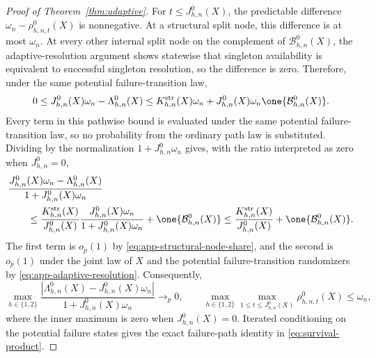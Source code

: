 \begin{appendix}
\begin{proof}[Proof of Theorem~\ref{thm:adaptive}]
For \(t\le J_{h,n}^0(X)\), the predictable difference
\(\omega_n-\rho_{h,n,t}^0(X)\) is nonnegative. At a structural split node, this
difference is at most \(\omega_n\). At every other internal split node
on the complement of \(\mathcal B_{h,n}^0(X)\), the adaptive-resolution
argument shows statewise that singleton availability is equivalent to
successful singleton resolution, so
the difference is zero. Therefore, under the same potential failure-transition law,
\begin{equation*}
0\le J_{h,n}^0(X)\omega_n-\Lambda_{h,n}^0(X)
\le K_{h,n}^{\rm str}(X)\omega_n
+J_{h,n}^0(X)\omega_n\one\{\mathcal B_{h,n}^0(X)\}.
\end{equation*}
Every term in this pathwise bound is evaluated under the same potential
failure-transition law, so no probability from the ordinary path law is
substituted. Dividing by the
normalization \(1+J_{h,n}^0\omega_n\) gives, with the ratio interpreted
as zero when \(J_{h,n}^0=0\),
\begin{align}
&\frac{J_{h,n}^0(X)\omega_n-\Lambda_{h,n}^0(X)}
{1+J_{h,n}^0(X)\omega_n}\notag\\
&\qquad\le
\frac{K_{h,n}^{\rm str}(X)}{J_{h,n}^0(X)}
\frac{J_{h,n}^0(X)\omega_n}{1+J_{h,n}^0(X)\omega_n}
+\one\{\mathcal B_{h,n}^0(X)\}
\le
\frac{K_{h,n}^{\rm str}(X)}{J_{h,n}^0(X)}
+\one\{\mathcal B_{h,n}^0(X)\}.\notag
\end{align}
The first term is \(o_p(1)\) by
\eqref{eq:app-structural-node-share}, and the second is \(o_p(1)\) under the
joint law of \(X\) and the potential failure-transition randomizers by
\eqref{eq:app-adaptive-resolution}. Consequently,
\begin{equation}\label{eq:app-source-hazard-equivalence}
\max_{h\in\{1,2\}}
\frac{\left|\Lambda_{h,n}^0(X)-J_{h,n}^0(X)\omega_n\right|}
{1+J_{h,n}^0(X)\omega_n}\longrightarrow_p0,
\qquad
\max_{h\in\{1,2\}}\max_{1\le t\le J_{h,n}^0(X)}
\rho_{h,n,t}^0(X)\le\omega_n,
\end{equation}
where the inner maximum is zero when \(J_{h,n}^0(X)=0\).
Iterated conditioning on the potential failure states gives the exact
failure-path identity in \eqref{eq:survival-product}.


\end{proof}
\end{appendix}
